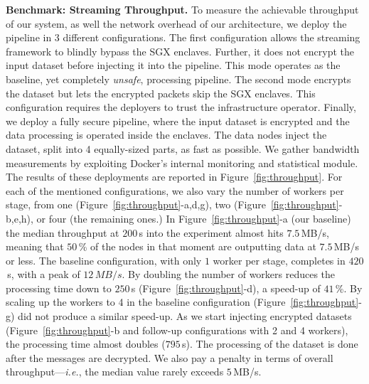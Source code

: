 \noindent\textbf{Benchmark: Streaming Throughput.}
To measure the achievable throughput of our system, as well the network overhead of our architecture, we deploy the \SYS{} pipeline in 3 different configurations.
The first configuration allows the streaming framework to blindly bypass the SGX enclaves.
Further, it does not encrypt the input dataset before injecting it into the pipeline.
This mode operates as the baseline, yet completely \emph{unsafe}, processing pipeline.
The second mode encrypts the dataset but lets the encrypted packets skip the SGX enclaves.
This configuration requires the deployers to trust the infrastructure operator.
Finally, we deploy a fully secure pipeline, where the input dataset is encrypted and the data processing is operated inside the enclaves.
The data nodes inject the dataset, split into 4 equally-sized parts, as fast as possible.
We gather bandwidth measurements by exploiting Docker's internal monitoring and statistical module.
% 
The results of these deployments are reported in Figure~\ref{fig:throughput}.
For each of the mentioned configurations, we also vary the number of workers per stage, from one (Figure~\ref{fig:throughput}-a,d,g), two (Figure~\ref{fig:throughput}-b,e,h), or four (the remaining ones.)
In Figure~\ref{fig:throughput}-a (our baseline) the median throughput at $200$\,s into the experiment almost hits $7.5$\,MB/s, meaning that $50$\,\% of the nodes in that moment are outputting data at $7.5$\,MB/s or less.
The baseline configuration, with only $1$ worker per stage, completes in $420$\,s, with a peak of $12\,MB/s$.
By doubling the number of workers reduces the processing time down to $250$\,s (Figure~\ref{fig:throughput}-d), a speed-up of $41$\,\%.
By scaling up the workers to 4 in the baseline configuration (Figure~\ref{fig:throughput}-g) did not produce a similar speed-up.
% 
As we start injecting encrypted datasets (Figure~\ref{fig:throughput}-b and follow-up configurations with 2 and 4 workers), the processing time almost doubles ($795$\,s).
The processing of the dataset is done after the messages are decrypted.
We also pay a penalty in terms of overall throughput---\emph{i.e.}, the median value rarely exceeds $5$\,MB/s.
